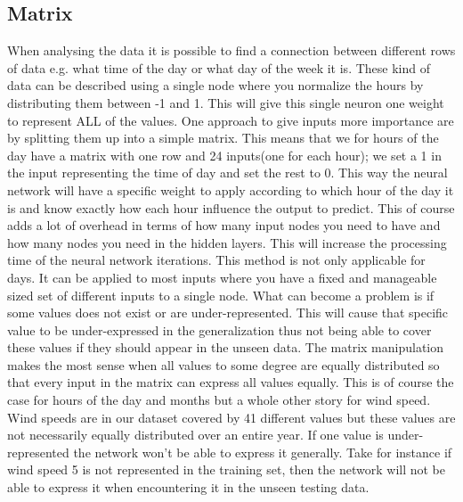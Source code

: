 \subsection{Matrix}
\label{sec:Matrix}
When analysing the data it is possible to find a connection between different rows of data e.g. what time of the day or what day of the week it is. These kind of data can be described using a single node where you normalize the hours by distributing them between -1 and 1. This will give this single neuron one weight to represent ALL of the values. One approach to give inputs more importance are by splitting them up into a simple matrix. This means that we for hours of the day have a matrix with one row and 24 inputs(one for each hour); we set a 1 in the input representing the time of day and set the rest to 0. This way the neural network will have a specific weight to apply according to which hour of the day it is and know exactly how each hour influence the output to predict. This of course adds a lot of overhead in terms of how many input nodes you need to have and how many nodes you need in the hidden layers. This will increase the processing time of the neural network iterations. This method is not only applicable for days. It can be applied to most inputs where you have a fixed and manageable sized set of different inputs to a single node. What can become a problem is if some values does not exist or are under-represented. This will cause that specific value to be under-expressed in the generalization thus not being able to cover these values if they should appear in the unseen data. The matrix manipulation makes the most sense when all values to some degree are equally distributed so that every input in the matrix can express all values equally. This is of course the case for hours of the day and months but a whole other story for wind speed. Wind speeds are in our dataset covered by 41 different values but these values are not necessarily equally distributed over an entire year. If one value is under-represented the network won't be able to express it generally. Take for instance if wind speed 5 is not represented in the training set, then the network will not be able to express it when encountering it in the unseen testing data.

